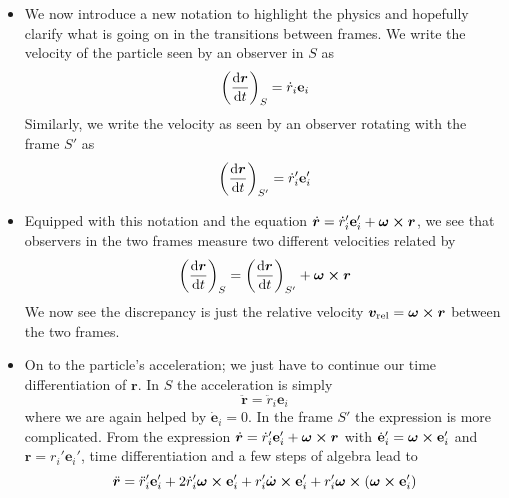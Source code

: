 \documentclass[11pt, a4paper]{article}
\newcommand{\e}{\mathbf{e}} %
\newcommand{\bdot}[1]{\dot{\bm{#1}}} %
\newcommand{\bddot}[1]{\ddot{\bm{#1}}} %
\begin{document}
\begin{itemize}
	\item We now introduce a new notation to highlight the physics and hopefully clarify what is going on in the transitions between frames. We write the velocity of the particle seen by an observer in $ S $ as
	\begin{equation*}
		\left(\dv{\bm{r}}{t}\right)_{S} = \dot{r}_{i}\e_{i}
	\end{equation*}
	Similarly, we write the velocity as seen by an observer rotating with the frame $ S' $ as
	\begin{equation*}
		\left(\dv{\bm{r}}{t}\right)_{S'} = \dot{r}_{i}'\e_{i}'
	\end{equation*}
	
	\item Equipped with this notation and the equation $ 	\bdot{r} = \dot{r}_{i}'\e_{i}' + \bm{\omega} \cross \bm{r} $, we see that observers in the two frames measure two different velocities related by 
	\begin{equation*}
		\left(\dv{\bm{r}}{t}\right)_{S} = \left(\dv{\bm{r}}{t}\right)_{S'} + \bm{\omega} \cross \bm{r}
	\end{equation*}
	We now see the discrepancy is just the relative velocity $ \bm{v}_{\text{rel}} = \bm{\omega} \cross \bm{r} $ between the two frames.
	
	\item On to the particle's acceleration; we just have to continue our time differentiation of $ \bm{r} $. In $ S $ the acceleration is simply
	\begin{equation*}
		\bddot{r} = \ddot{r}_{i} \e_{i}
	\end{equation*}
	where we are again helped by $ \dot{\e}_{i} = 0$. In the frame $ S' $ the expression is more complicated. From the expression $ \bdot{r} = \dot{r}_{i}'\e_{i}' + \bm{\omega} \cross \bm{r} $ with $ \dot{\e}_{i}' = \bm{\omega} \cross \e_{i}' $ and $ \bm{r} = r_{i}' \e_{i}' $, time differentiation and a few steps of algebra lead to
	\begin{equation*}
		\bddot{r} = \ddot{r}_{i}'\e_{i}' + 2 \dot{r}_{i}' \bm{\omega} \cross \e_{i}' + r_{i}'\bdot{\omega} \cross \e_{i}' + r_{i}'\bm{\omega} \cross (\bm{\omega} \cross \e_{i}')
	\end{equation*}
		

\end{itemize}
\end{document}
